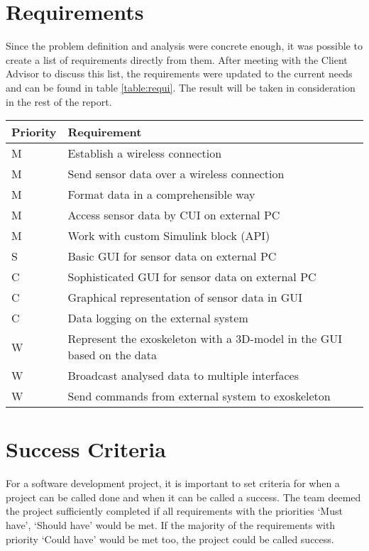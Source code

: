 \section{Requirements}\label{sec:req}
Since the problem definition and analysis were concrete enough, it was possible to create a list of requirements directly from them. After meeting with the Client Advisor to discuss this list, the requirements were updated to the current needs and can be found in table \ref{table:requi}. The result will be taken in consideration in the rest of the report.\\

{\renewcommand{\arraystretch}{1.5}
	\centering
	\begin{tabular}{ | l | l | }
		\hline
		\bfseries{Priority} & \bfseries{Requirement} \\ \hline
		M & Establish a wireless connection \\ \hline
		M & Send sensor data over a wireless connection \\ \hline
		M & Format data in a comprehensible way \\ \hline
		M & Access sensor data by CUI on external PC \\ \hline
		M & Work with custom Simulink block (API) \\ \hline
		S & Basic GUI for sensor data on external PC \\ \hline
		C & Sophisticated GUI for sensor data on external PC\\ \hline
		C & Graphical representation of sensor data in GUI\\ \hline
		C & Data logging on the external system \\ \hline
		W & Represent the exoskeleton with a 3D-model in the GUI based on the data \\ \hline
		W & Broadcast analysed data to multiple interfaces \\ \hline 
		W & Send commands from external system to exoskeleton \\ \hline 
	\end{tabular}
	\label{table:requi}
}

\section{Success Criteria} \label{sec:suc}
For a software development project, it is important to set criteria for when a project can be called done and when it can be called a success. The team deemed the project sufficiently completed if all requirements with the priorities `Must have', `Should have' would be met. If the majority of the requirements with priority `Could have' would be met too, the project could be called success.
